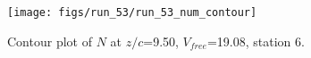 \begin{figure}[H]
\centering
\texttt{[image: figs/run\_53/run\_53\_num\_contour]}
\caption{Contour plot of $N$ at $z/c$=9.50, $V_{free}$=19.08, station 6.}
\label{fig:run_53_num_contour}
\end{figure}


